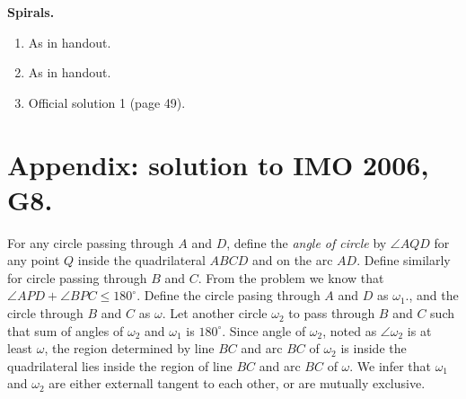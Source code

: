 \documentclass[11pt,a4paper]{article}
\begin{document}
\textbf {Spirals.}
\begin{enumerate}
\item As in handout.
\item As in handout.
\item Official solution 1 (page 49).
\end{enumerate}

\section{Appendix: solution to IMO 2006, G8.}

For any circle passing through $A$ and $D$, define the \emph{angle of circle} by $\angle AQD$ for any point $Q$ inside the quadrilateral $ABCD$ and on the arc $AD$. Define similarly for circle passing through $B$ and $C$. From the problem we know that $\angle APD+\angle BPC\le 180^{\circ}$. Define the circle pasing through $A$ and $D$ as $\omega_1$., and the circle through $B$ and $C$ as $\omega$. Let another circle $\omega_2$ to pass through $B$ and $C$ such that sum of angles of $\omega_2$ and $\omega_1$ is $180^{\circ}$. Since angle of $\omega_2$, noted as $\angle\omega_2$ is at least $\omega$, the region determined by line $BC$ and arc $BC$ of $\omega_2$ is inside the quadrilateral lies inside the region of line $BC$ and arc $BC$ of $\omega$. We infer that $\omega_1$ and $\omega_2$ are either externall tangent to each other, or are mutually exclusive.
\end{document}

